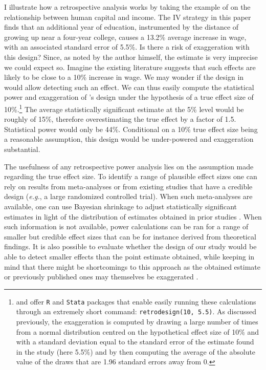 \documentclass[usletter, 12pt]{article}
\begin{document}
				I illustrate how a retrospective analysis works by taking the example of \cite{card_using_1993} on the relationship between human capital and income. The IV strategy in this paper finds that an additional year of education, instrumented by the distance of growing up near a four-year college, causes a 13.2\% average increase in wage, with an associated standard error of 5.5\%. Is there a risk of exaggeration with this design? Since, as noted by the author himself, the estimate is very imprecise we could expect so. Imagine the existing literature suggests that such effects are likely to be close to a 10\% increase in wage. We may wonder if the design in \cite{card_using_1993} would allow detecting such an effect. We can thus easily compute the statistical power and exaggeration of \citeauthor{card_using_1993}'s design under the hypothesis of a true effect size of 10\%.\footnote{\cite{timm_retrodesign_2019} and \cite{linden_retrodesign_2019} offer \texttt{R} and \texttt{Stata} packages that enable easily running these calculations through an extremely short command: \texttt{retrodesign(10, 5.5)}. As discussed previously, the exaggeration is computed by drawing a large number of times from a normal distribution centred on the hypothetical effect size of 10\% and with a standard deviation equal to the standard error of the estimate found in the study (here 5.5\%) and by then computing the average of the absolute value of the draws that are 1.96 standard errors away from 0.} The average statistically significant estimate at the 5\% level would be roughly of 15\%, therefore overestimating the true effect by a factor of 1.5. Statistical power would only be 44\%. Conditional on a 10\% true effect size being a reasonable assumption, this design would be under-powered and exaggeration substantial. 
			
				The usefulness of any retrospective power analysis lies on the assumption made regarding the true effect size. To identify a range of plausible effect sizes one can rely on results from meta-analyses or from existing studies that have a credible design (\textit{e.g.}, a large randomized controlled trial). When such meta-analyses are available, one can use Bayesian shrinkage to adjust statistically significant estimates in light of the distribution of estimates obtained in prior studies \citep{zwet_proposal_2021, zwet_significance_2021, zwet_statistical_2021}. When such information is not available, power calculations can be ran for a range of smaller but credible effect sizes that can be for instance derived from theoretical findings. It is also possible to evaluate whether the design of our study would be able to detect smaller effects than the point estimate obtained, while keeping in mind that there might be shortcomings to this approach as the obtained estimate or previously published ones may themselves be exaggerated \citep{gelman_beyond_2014}.
				
\end{document}
